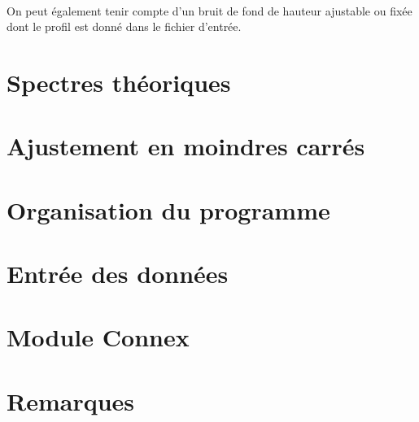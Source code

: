 \documentclass[a4paper]{article}
\begin{document}
\paragraph{}
On peut également tenir compte d'un bruit de fond de hauteur ajustable ou fixée dont le profil est donné dans le fichier d'entrée.
\newpage
\tableofcontents
\newpage
\section{Spectres théoriques}

\FloatBarrier

\FloatBarrier
\section{Ajustement en moindres carrés}

\newpage
\section{Organisation du programme}

\newpage
\section{Entrée des données}


\newpage
\section{Module Connex}

\newpage
\section{Remarques}

\newpage


\end{document}
